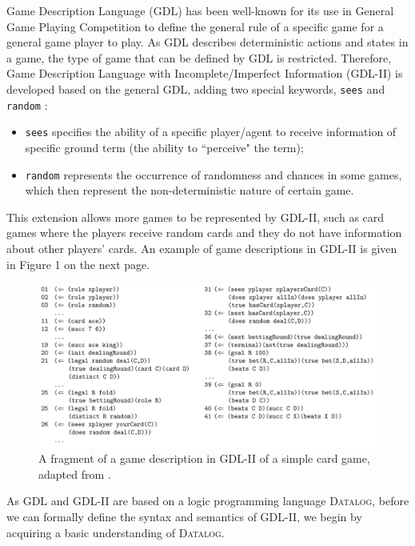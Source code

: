 \documentclass{article}
\theoremstyle{theorem}
\theoremstyle{lemma}
\theoremstyle{definition}
\theoremstyle{remark}
\begin{document}
 Game Description Language (GDL) has been well-known for its use
in General Game Playing Competition to define the general rule of a
specific game for a general game player to play. As GDL describes
deterministic actions and states in a game, the type of game that can
be defined by GDL is restricted. Therefore, Game Description Language with Incomplete/Imperfect Information (GDL-II) is developed based on
the general GDL, adding two special keywords, \texttt{sees} and
\texttt{random} \citep{gdlii}:
\begin{itemize}
    \item \texttt{sees} specifies the ability of a specific
      player/agent to receive information of specific ground term (the
      ability to ``perceive" the term);
    \item \texttt{random} represents the occurrence of randomness and chances in some games, which then represent the non-deterministic nature of certain game.
\end{itemize}
This extension allows more games to be represented by GDL-II, such as card games where the players receive random cards and they do not have information about other players' cards. An example of game descriptions in GDL-II is given in Figure 1 on the next page.
\begin{figure}[ht!]
\centering
\includegraphics[scale=0.3]{gdl-iiCode.png}
\caption{A fragment of a game description in GDL-II of a simple card game, adapted from \citep{gdlii}.}
\label{fig:gdl-iiCode}
\end{figure}
\par As GDL and GDL-II are based on a logic programming language \textsc{Datalog}, before we can formally define the syntax and
semantics of GDL-II, we begin by acquiring a basic understanding of
\textsc{Datalog}.
\end{document}

